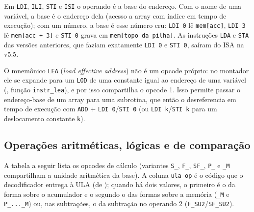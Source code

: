 Em \lstinline|LDI|, \lstinline|ILI|, \lstinline|STI| e \lstinline|ISI| o operando é a base
do endereço. Com o nome de uma variável, a base é o endereço dela (acesso a array com
índice em tempo de execução); com um número, a base é esse número cru: \lstinline|LDI 0|
lê \lstinline|mem[acc]|, \lstinline|LDI 3| lê \lstinline|mem[acc + 3]| e \lstinline|STI 0|
grava em \lstinline|mem[topo da pilha]|. As instruções \lstinline|LDA| e \lstinline|STA| das
versões anteriores, que faziam exatamente \lstinline|LDI 0| e \lstinline|STI 0|, saíram do
ISA na v5.5.

\begin{nota}
O mnemônico \lstinline|LEA| (\emph{load effective address}) não é um opcode próprio: no
montador ele se expande para um \lstinline|LOD| de uma constante igual ao endereço de uma
variável (, função \lstinline|instr_lea|), e por isso compartilha o opcode 1.
Isso permite passar o endereço-base de um array para uma subrotina, que então o
desreferencia em tempo de execução com \lstinline|ADD| + \lstinline|LDI 0|/\lstinline|STI 0|
(ou \lstinline|LDI k|/\lstinline|STI k| para um deslocamento constante \lstinline|k|).
\end{nota}

\subsection{Operações aritméticas, lógicas e de comparação}
\label{sec:arq-isa-arit}

A tabela a seguir lista os opcodes de cálculo (variantes \lstinline|S_|, \lstinline|F_|,
\lstinline|SF_|, \lstinline|P_| e \lstinline|_M| compartilham a unidade aritmética da base).
A coluna \lstinline|ula_op| é o código que o decodificador entrega à ULA (de
); quando há dois valores, o primeiro é o da forma sobre o acumulador e
o segundo o das formas sobre a memória (\lstinline|_M| e \lstinline|P_..._M|) ou, nas
subtrações, o da subtração no operando 2 (\lstinline|F_SU2|/\lstinline|SF_SU2|).

